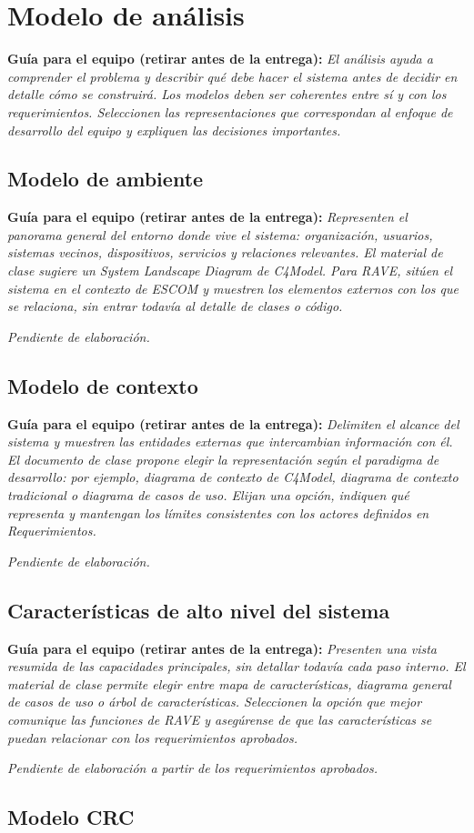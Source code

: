 \documentclass[12pt,letterpaper]{article}
\newcommand{\guia}[1]{\par\smallskip\noindent\textbf{Guía para el equipo (retirar antes de la entrega):} \textit{#1}\par\smallskip}
\begin{document}
\section{Modelo de análisis}
\guia{El análisis ayuda a comprender el problema y describir qué debe hacer el sistema antes de decidir en detalle cómo se construirá. Los modelos deben ser coherentes entre sí y con los requerimientos. Seleccionen las representaciones que correspondan al enfoque de desarrollo del equipo y expliquen las decisiones importantes.}
\subsection{Modelo de ambiente}
\guia{Representen el panorama general del entorno donde vive el sistema: organización, usuarios, sistemas vecinos, dispositivos, servicios y relaciones relevantes. El material de clase sugiere un System Landscape Diagram de C4Model. Para RAVE, sitúen el sistema en el contexto de ESCOM y muestren los elementos externos con los que se relaciona, sin entrar todavía al detalle de clases o código.}
\textit{Pendiente de elaboración.}
\subsection{Modelo de contexto}
\guia{Delimiten el alcance del sistema y muestren las entidades externas que intercambian información con él. El documento de clase propone elegir la representación según el paradigma de desarrollo: por ejemplo, diagrama de contexto de C4Model, diagrama de contexto tradicional o diagrama de casos de uso. Elijan una opción, indiquen qué representa y mantengan los límites consistentes con los actores definidos en Requerimientos.}
\textit{Pendiente de elaboración.}
\subsection{Características de alto nivel del sistema}
\guia{Presenten una vista resumida de las capacidades principales, sin detallar todavía cada paso interno. El material de clase permite elegir entre mapa de características, diagrama general de casos de uso o árbol de características. Seleccionen la opción que mejor comunique las funciones de RAVE y asegúrense de que las características se puedan relacionar con los requerimientos aprobados.}
\textit{Pendiente de elaboración a partir de los requerimientos aprobados.}
\subsection{Modelo CRC}
\end{document}
